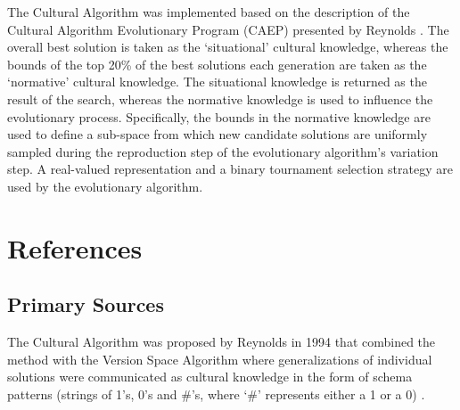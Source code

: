 \documentclass[a4paper, 11pt]{article}
\begin{document}
The Cultural Algorithm was implemented based on the description of the Cultural Algorithm Evolutionary Program (CAEP) presented by Reynolds \cite{Reynolds1999}. The overall best solution is taken as the `situational' cultural knowledge, whereas the bounds of the top 20\% of the best solutions each generation are taken as the `normative' cultural knowledge. The situational knowledge is returned as the result of the search, whereas the normative knowledge is used to influence the evolutionary process. Specifically, the bounds in the normative knowledge are used to define a sub-space from which new candidate solutions are uniformly sampled during the reproduction step of the evolutionary algorithm's variation step. A real-valued representation and a binary tournament selection strategy are used by the evolutionary algorithm.




\section{References}
\label{sec:references}

% 
% 
\subsection{Primary Sources}
The Cultural Algorithm was proposed by Reynolds in 1994 that combined the method with the Version Space Algorithm where generalizations of individual solutions were communicated as cultural knowledge in the form of schema patterns (strings of 1's, 0's and \#'s, where `\#' represents either a 1 or a 0) \cite{Reynolds1994}. 

% 
% 
\end{document}
